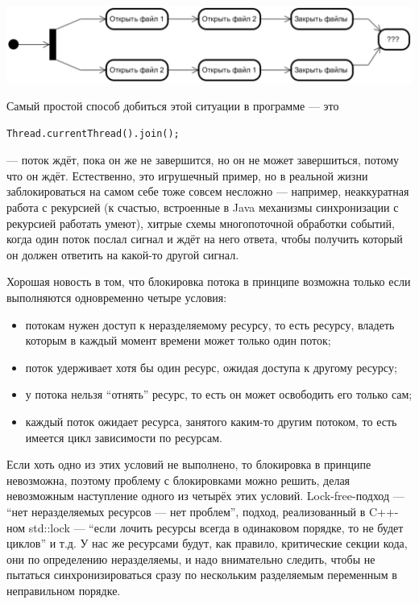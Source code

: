 \documentclass[a5paper]{article}
\begin{document}
\begin{center}
	\includegraphics[width=\textwidth]{deadlock.png}
\end{center}

Самый простой способ добиться этой ситуации в программе --- это

\begin{verbatim}
Thread.currentThread().join();
\end{verbatim}

--- поток ждёт, пока он же не завершится, но он не может завершиться, потому что он ждёт. Естественно, это игрушечный пример, но в реальной жизни заблокироваться на самом себе тоже совсем несложно --- например, неаккуратная работа с рекурсией (к счастью, встроенные в Java механизмы синхронизации с рекурсией работать умеют), хитрые схемы многопоточной обработки событий, когда один поток послал сигнал и ждёт на него ответа, чтобы получить который он должен ответить на какой-то другой сигнал.

Хорошая новость в том, что блокировка потока в принципе возможна только если выполняются одновременно четыре условия:
\begin{itemize}
	\item потокам нужен доступ к неразделяемому ресурсу, то есть ресурсу, владеть которым в каждый момент времени может только один поток;
	\item поток удерживает хотя бы один ресурс, ожидая доступа к другому ресурсу;
	\item у потока нельзя ``отнять'' ресурс, то есть он может освободить его только сам;
	\item каждый поток ожидает ресурса, занятого каким-то другим потоком, то есть имеется цикл зависимости по ресурсам.
\end{itemize}

Если хоть одно из этих условий не выполнено, то блокировка в принципе невозможна, поэтому проблему с блокировками можно решить, делая невозможным наступление одного из четырёх этих условий. Lock-free-подход --- ``нет неразделяемых ресурсов --- нет проблем'', подход, реализованный в C++-ном std::lock --- ``если лочить ресурсы всегда в одинаковом порядке, то не будет циклов'' и т.д. У нас же ресурсами будут, как правило, критические секции кода, они по определению неразделяемы, и надо внимательно следить, чтобы не пытаться синхронизироваться сразу по нескольким разделяемым переменным в неправильном порядке.
\end{document}
